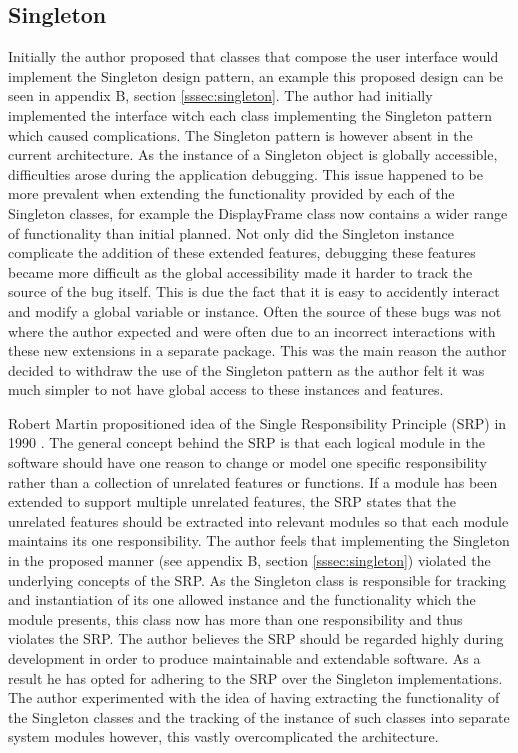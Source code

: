 \subsection{Singleton}

Initially the author proposed that classes that compose the user interface would implement the Singleton design pattern\cite{gof:design:singleton}, an example this proposed design can be seen in appendix B, section \ref{sssec:singleton}. The author had initially implemented the interface witch each class implementing the Singleton pattern which caused complications. The Singleton pattern is however absent in the current architecture. As the instance of a Singleton object is globally accessible, difficulties arose during the application debugging. This issue happened to be more prevalent when extending the functionality provided by each of the Singleton classes, for example the DisplayFrame class now contains a wider range of functionality than initial planned. Not only did the Singleton instance complicate the addition of these extended features, debugging these features became more difficult as the global accessibility made it harder to track the source of the bug itself. This is due the fact that it is easy to accidently interact and modify a global variable or instance. Often the source of these bugs was not where the author expected and were often due to an incorrect interactions with these new extensions in a separate package. This was the main reason the author decided to withdraw the use of the Singleton pattern as the author felt it was much simpler to not have global access to these instances and features.

Robert Martin propositioned idea of the Single Responsibility Principle (SRP) in 1990 \cite{SRP:site}. The general concept behind the SRP is that each logical module in the software should have one reason to change or model one specific responsibility rather than a collection of unrelated features or functions. If a module has been extended to support multiple unrelated features, the SRP states that the unrelated features should be extracted into relevant modules so that each module maintains its one responsibility. The author feels that implementing the Singleton in the proposed manner (see appendix B, section \ref{sssec:singleton}) violated the underlying concepts of the SRP. As the Singleton class is responsible for tracking and instantiation of its one allowed instance and the functionality which the module presents, this class now has more than one responsibility and thus violates the SRP. The author believes the SRP should be regarded highly during development in order to produce maintainable and extendable software. As a result he has opted for adhering to the SRP over the Singleton implementations. The author experimented with the idea of having extracting the functionality of the Singleton classes and the tracking of the instance of such classes into separate system modules however, this vastly overcomplicated the architecture.

